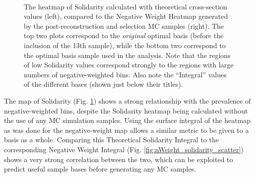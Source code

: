     \begin{figure}[tbh]
    	\centering
        \\
        \caption{
            The heatmap of Solidarity calculated with theoretical cross-section values (left),
                compared to the Negative Weight Heatmap generated by the post-reconstruction and selection MC samples (right).
            The top two plots correspond to the \textit{original} optimal basis (before the inclusion of the 13th sample),
                while the bottom two correspond to the optimal basis sample used in the analysis.
            Note that the regions of low Solidarity values correspond strongly to the regions with large numbers of negative-weighted bins.
            Also note the ``Integral'' values of the different bases (shown just below their titles).
        }
        \label{fig:solidarity_heatmaps}
    \end{figure}

    The map of Solidarity (Fig. \ref{fig:solidarity_heatmaps}) shows a strong relationship with the prevalence of negative-weighted bins,
        despite the Solidarity heatmap being calculated without the use of any MC simulation samples.
    Using the surface integral of the heatmap as was done for the negative-weight map allows a similar metric to be given to a basis as a whole.
    Comparing this Theoretical Solidarity Integral to the corresponding Negative Weight Integral (Fig. \ref{fig:nWeight_solidarity_scatter})
        shows a very strong correlation between the two,
        which can be exploited to predict useful sample bases before generating any MC samples.

